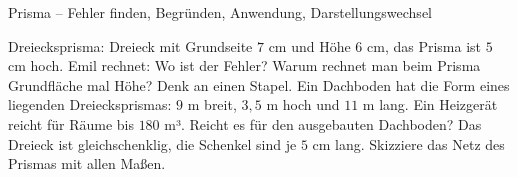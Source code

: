 \begin{aufgabe}{Prisma – Fehler finden, Begründen, Anwendung, Darstellungswechsel}
\begin{teile}
\teil Dreiecksprisma: Dreieck mit Grundseite $7$ cm und Höhe $6$ cm, das Prisma ist $5$ cm hoch. Emil rechnet:  Wo ist der Fehler?
\teil Warum rechnet man beim Prisma Grundfläche mal Höhe? Denk an einen Stapel.
\teil Ein Dachboden hat die Form eines liegenden Dreiecksprismas: $9$ m breit, $3{,}5$ m hoch und $11$ m lang. Ein Heizgerät reicht für Räume bis $180$ m³. Reicht es für den ausgebauten Dachboden?
\teil Das Dreieck ist gleichschenklig, die Schenkel sind je $5$ cm lang. Skizziere das Netz des Prismas mit allen Maßen.

 
\end{teile}
\end{aufgabe}
